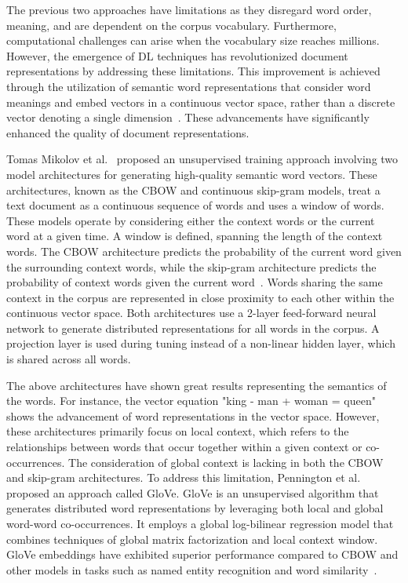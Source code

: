 The previous two approaches have limitations as they disregard word order, meaning, and are dependent on the corpus vocabulary. Furthermore, computational challenges can arise when the vocabulary size reaches millions. However, the emergence of \ac{DL} techniques has revolutionized document representations by addressing these limitations. This improvement is achieved through the utilization of semantic word representations that consider word meanings and embed vectors in a continuous vector space, rather than a discrete vector denoting a single dimension~\cite{mikolov2013efficient, pennington2014glove}. These advancements have significantly enhanced the quality of document representations.

Tomas Mikolov et al.~\cite{mikolov2013efficient} proposed an unsupervised training approach involving two model architectures for generating high-quality semantic word vectors. These architectures, known as the \ac{CBOW} and continuous skip-gram models, treat a text document as a continuous sequence of words and uses a window of words. These models operate by considering either the context words or the current word at a given time. A window is defined, spanning the length of the context words. The \ac{CBOW} architecture predicts the probability of the current word given the surrounding context words, while the skip-gram architecture predicts the probability of context words given the current word~\cite{mikolov2013efficient}. Words sharing the same context in the corpus are represented in close proximity to each other within the continuous vector space. Both architectures use a 2-layer feed-forward neural network to generate distributed representations for all words in the corpus. A projection layer is used during tuning instead of a non-linear hidden layer, which is shared across all words.


The above architectures have shown great results representing the semantics of the words. For instance, the vector equation "king - man + woman = queen" shows the advancement of word representations in the vector space. However, these architectures primarily focus on local context, which refers to the relationships between words that occur together within a given context or co-occurrences. The consideration of global context is lacking in both the \ac{CBOW} and skip-gram architectures. To address this limitation, Pennington et al.~\cite{pennington2014glove} proposed an approach called \ac{GloVe}. \ac{GloVe} is an unsupervised algorithm that generates distributed word representations by leveraging both local and global word-word co-occurrences. It employs a global log-bilinear regression model that combines techniques of global matrix factorization and local context window. \ac{GloVe} embeddings have exhibited superior performance compared to \ac{CBOW} and other models in tasks such as named entity recognition and word similarity~\cite{pennington2014glove}.

